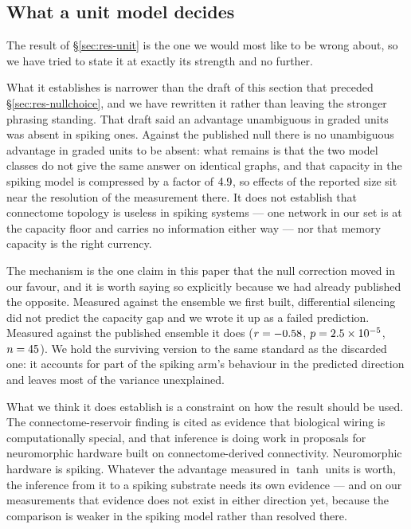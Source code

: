 \subsection{What a unit model decides}

The result of \S\ref{sec:res-unit} is the one we would most like to be wrong about, so we
have tried to state it at exactly its strength and no further.

What it establishes is narrower than the draft of this section that preceded
\S\ref{sec:res-nullchoice}, and we have rewritten it rather than leaving the stronger
phrasing standing. That draft said an advantage unambiguous in graded units was absent in
spiking ones. Against the published null there is no unambiguous advantage in graded units
to be absent: what remains is that the two model classes do not give the same answer on
identical graphs, and that capacity in the spiking model is compressed by a factor of
$4.9$, so effects of the reported size sit near the resolution of the
measurement there. It does not establish that connectome topology is useless in spiking
systems --- one network in our set is at the capacity floor and carries no information
either way --- nor that memory capacity is the right currency.

The mechanism is the one claim in this paper that the null correction moved in our favour,
and it is worth saying so explicitly because we had already published the opposite.
Measured against the ensemble we first built, differential silencing did not predict the
capacity gap and we wrote it up as a failed prediction. Measured against the published
ensemble it does ($r = -0.58$, $p = 2.5 \times 10^{-5}$, $n =
45$). We hold the surviving version to the same standard as the discarded
one: it accounts for part of the spiking arm's behaviour in the predicted direction and
leaves most of the variance unexplained.

What we think it does establish is a constraint on how the result should be used. The
connectome-reservoir finding is cited as evidence that biological wiring is computationally
special, and that inference is doing work in proposals for neuromorphic hardware built on
connectome-derived connectivity. Neuromorphic hardware is spiking. Whatever the advantage
measured in $\tanh$ units is worth, the inference from it to a spiking substrate needs its
own evidence --- and on our measurements that evidence does not exist in either direction
yet, because the comparison is weaker in the spiking model rather than resolved there.


